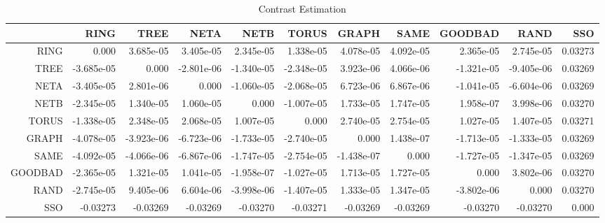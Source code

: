 \documentclass[a4paper,10pt]{article}
\begin{document}
\begin{landscape}
\begin{table}[!htp]
\centering\tiny
\caption{Contrast Estimation}
\begin{tabular}{
|r|r|r|r|r|r|r|r|r|r|r|}
\hline
 & RING& TREE& NETA& NETB& TORUS& GRAPH& SAME& GOODBAD& RAND& SSO\\
\hline
 RING&0.000&3.685e-05&3.405e-05&2.345e-05&1.338e-05&4.078e-05&4.092e-05&2.365e-05&2.745e-05&0.03273\\
\hline
 TREE&-3.685e-05&0.000&-2.801e-06&-1.340e-05&-2.348e-05&3.923e-06&4.066e-06&-1.321e-05&-9.405e-06&0.03269\\
\hline
 NETA&-3.405e-05&2.801e-06&0.000&-1.060e-05&-2.068e-05&6.723e-06&6.867e-06&-1.041e-05&-6.604e-06&0.03269\\
\hline
 NETB&-2.345e-05&1.340e-05&1.060e-05&0.000&-1.007e-05&1.733e-05&1.747e-05&1.958e-07&3.998e-06&0.03270\\
\hline
 TORUS&-1.338e-05&2.348e-05&2.068e-05&1.007e-05&0.000&2.740e-05&2.754e-05&1.027e-05&1.407e-05&0.03271\\
\hline
 GRAPH&-4.078e-05&-3.923e-06&-6.723e-06&-1.733e-05&-2.740e-05&0.000&1.438e-07&-1.713e-05&-1.333e-05&0.03269\\
\hline
 SAME&-4.092e-05&-4.066e-06&-6.867e-06&-1.747e-05&-2.754e-05&-1.438e-07&0.000&-1.727e-05&-1.347e-05&0.03269\\
\hline
 GOODBAD&-2.365e-05&1.321e-05&1.041e-05&-1.958e-07&-1.027e-05&1.713e-05&1.727e-05&0.000&3.802e-06&0.03270\\
\hline
 RAND&-2.745e-05&9.405e-06&6.604e-06&-3.998e-06&-1.407e-05&1.333e-05&1.347e-05&-3.802e-06&0.000&0.03270\\
\hline
 SSO&-0.03273&-0.03269&-0.03269&-0.03270&-0.03271&-0.03269&-0.03269&-0.03270&-0.03270&0.000\\
\hline

\end{tabular}
\end{table}

\newpage


\end{landscape}
\end{document}

